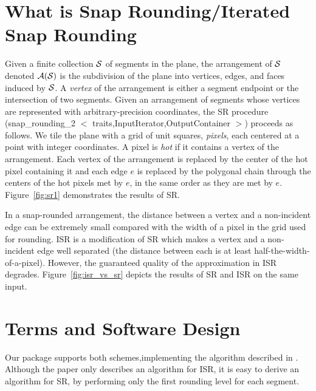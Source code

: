 \section{What is Snap Rounding/Iterated Snap Rounding}
Given a finite collection $\S$ of segments in the plane, the
arrangement of $\S$ denoted $\A(\S)$ is the subdivision of the plane
into vertices, edges, and faces induced by $\S$. %
A {\it vertex\/} of the arrangement is either a segment endpoint or
the intersection of two segments. Given an arrangement of segments
whose vertices are represented with arbitrary-precision coordinates,
the SR procedure
(snap\_rounding\_2 $<$ traits,InputIterator,OutputContainer $>$)
proceeds as follows.  We tile the plane
with a grid of unit squares, {\it pixels}, each centered at a point
with integer coordinates. A pixel is {\it hot\/} if it contains a
vertex of the arrangement. Each vertex of the arrangement is replaced
by the center of the hot pixel containing it and each edge $e$ is
replaced by the polygonal chain through the centers of the hot pixels
met by $e$, in the same order as they are met by $e$. 
Figure~\ref{fig:sr1} demonstrates the results of SR.

In a snap-rounded arrangement, the distance between a vertex and
a non-incident edge can be extremely small compared with the width of a
pixel in the grid used for rounding. ISR
is a modification of SR which makes a vertex and a
non-incident edge well separated (the distance between each is at least
half-the-width-of-a-pixel). However, the guaranteed quality of the
approximation in ISR degrades. Figure~\ref{fig:isr_vs_sr} depicts
the results of SR and ISR on the same input.

\section{Terms and Software Design}

Our package supports both schemes,implementing the algorithm described in \cite{isr-2002}.
Although the paper only describes an algorithm for ISR,
it is easy to derive an algorithm for SR, by performing only
the first rounding level for each segment.

